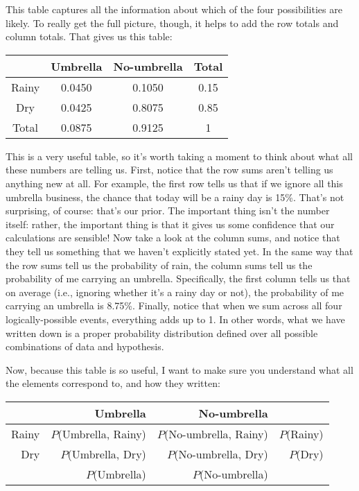 \noindent
This table captures all the information about which of the four possibilities are likely. To really get the full picture, though, it helps to add the row totals and column totals. That gives us this table:

\begin{center}
\begin{tabular}{c|cc|c}
& Umbrella & No-umbrella & Total \\ \hline
Rainy & 0.0450 & 0.1050 & 0.15 \\
Dry & 0.0425 & 0.8075  & 0.85 \\ \hline
Total & 0.0875 & 0.9125 & 1
\end{tabular}
\end{center}

\noindent
This is a very useful table, so it's worth taking a moment to think about what all these numbers are telling us. First, notice that the row sums aren't telling us anything new at all. For example, the first row tells us that if we ignore all this umbrella business, the chance that today will be a rainy day is 15\%. That's not surprising, of course: that's our prior. The important thing isn't the number itself: rather, the important thing is that it gives us some confidence that our calculations are sensible! Now take a look at the column sums, and notice that they tell us something that we haven't explicitly stated yet. In the same way that the row sums tell us the probability of rain, the column sums tell us the probability of me carrying an umbrella. Specifically, the first column tells us that on average (i.e., ignoring whether it's a rainy day or not), the probability of me carrying an umbrella is 8.75\%. Finally, notice that when we sum across all four logically-possible events, everything adds up to 1. In other words, what we have written down is a proper probability distribution defined over all possible combinations of data and hypothesis.


Now, because this table is so useful, I want to make sure you understand what all the elements correspond to, and how they written:

\begin{center}
\begin{tabular}{r|rr|r}
& Umbrella & No-umbrella &  \\[6pt] \hline
Rainy & $P$(Umbrella, Rainy) & $P$(No-umbrella, Rainy) & $P$(Rainy) \\[6pt]
Dry & $P$(Umbrella, Dry) & $P$(No-umbrella, Dry)  & $P$(Dry) \\[6pt] \hline
 & $P$(Umbrella) & $P$(No-umbrella) & 
\end{tabular}
\end{center}

